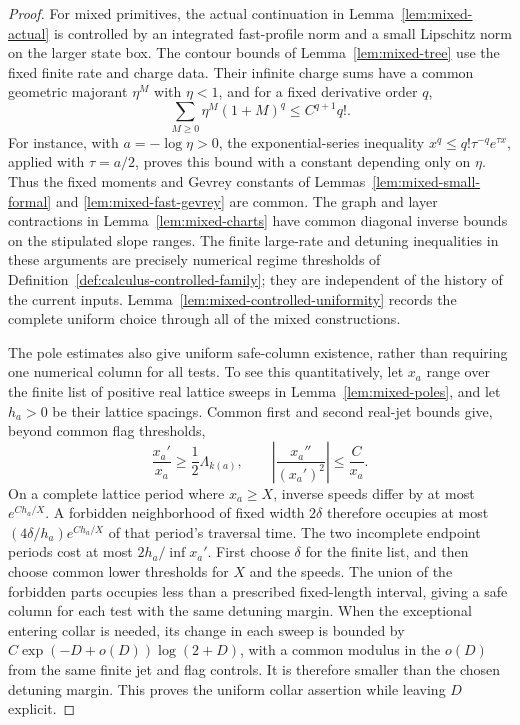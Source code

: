 \begin{proof}
For mixed primitives, the actual continuation in
Lemma~\ref{lem:mixed-actual} is controlled by an integrated fast-profile
norm and a small Lipschitz norm on the larger state box.  The contour
bounds of Lemma~\ref{lem:mixed-tree} use the fixed finite rate and charge
data.  Their infinite charge sums have a common geometric majorant
$\eta^M$ with $\eta<1$, and for a fixed derivative order $q$,
\[
 \sum_{M\ge0}\eta^M(1+M)^q\le C^{q+1}q!.
\]
For instance, with $a=-\log\eta>0$, the exponential-series inequality
$x^q\le q!\tau^{-q}e^{\tau x}$, applied with $\tau=a/2$, proves this
bound with a constant depending only on $\eta$.  Thus the fixed moments
and Gevrey constants of Lemmas~\ref{lem:mixed-small-formal} and
\ref{lem:mixed-fast-gevrey} are common.  The graph and layer contractions
in Lemma~\ref{lem:mixed-charts} have common diagonal inverse bounds on
the stipulated slope ranges.  The finite large-rate and detuning
inequalities in these arguments are precisely numerical regime
thresholds of Definition~\ref{def:calculus-controlled-family}; they
are independent of the history of the current inputs.
Lemma~\ref{lem:mixed-controlled-uniformity} records the complete uniform
choice through all of the mixed constructions.

The pole estimates also give uniform safe-column existence, rather than
requiring one numerical column for all tests.  To see this quantitatively,
let $x_a$ range over the finite list of positive real lattice sweeps in
Lemma~\ref{lem:mixed-poles}, and let $h_a>0$ be their lattice spacings.
Common first and second real-jet bounds give, beyond common flag
thresholds,
\[
 \frac{x_a'}{x_a}\ge\frac12\Lambda_{k(a)},\qquad
 \left|\frac{x_a''}{(x_a')^2}\right|\le\frac{C}{x_a}.
\]
On a complete lattice period where $x_a\ge X$, inverse speeds differ
by at most $e^{Ch_a/X}$.  A forbidden neighborhood of fixed width
$2\delta$ therefore occupies at most
$(4\delta/h_a)e^{Ch_a/X}$ of that period's traversal time.  The two
incomplete endpoint periods cost at most
$2h_a/\inf x_a'$.  First choose $\delta$ for the finite list, and then
choose common lower thresholds for $X$ and the speeds.  The union of
the forbidden parts occupies less than a prescribed fixed-length
interval, giving a safe column for each test with the same detuning
margin.  When the exceptional entering collar is needed, its change in
each sweep is bounded by
$C\exp(-D+o(D))\log(2+D)$, with a common modulus in the $o(D)$ from the
same finite jet and flag controls.  It is therefore smaller than the
chosen detuning margin.  This proves the uniform collar assertion while
leaving $D$ explicit.


\end{proof}
